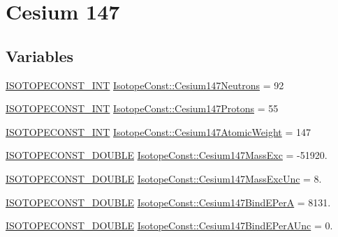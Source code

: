 \hypertarget{group___isotope_const-_cesium-_cs147}{}\section{Cesium 147}
\label{group___isotope_const-_cesium-_cs147}
\subsection*{Variables}
\begin{DoxyCompactItemize}
\item 
\mbox{\hyperlink{group___isotope_const-_macros_ga5f18360b3e99483a35c32d789e62621c}{I\+S\+O\+T\+O\+P\+E\+C\+O\+N\+S\+T\+\_\+\+I\+NT}} \mbox{\hyperlink{group___isotope_const-_cesium-_cs147_gabbcb56b566934b3c788625c9cc69043b}{Isotope\+Const\+::\+Cesium147\+Neutrons}} = 92
\item 
\mbox{\hyperlink{group___isotope_const-_macros_ga5f18360b3e99483a35c32d789e62621c}{I\+S\+O\+T\+O\+P\+E\+C\+O\+N\+S\+T\+\_\+\+I\+NT}} \mbox{\hyperlink{group___isotope_const-_cesium-_cs147_ga363b7089be966faa0757ee5744bb342f}{Isotope\+Const\+::\+Cesium147\+Protons}} = 55
\item 
\mbox{\hyperlink{group___isotope_const-_macros_ga5f18360b3e99483a35c32d789e62621c}{I\+S\+O\+T\+O\+P\+E\+C\+O\+N\+S\+T\+\_\+\+I\+NT}} \mbox{\hyperlink{group___isotope_const-_cesium-_cs147_ga1dedcf764a3126d837083024b1182d49}{Isotope\+Const\+::\+Cesium147\+Atomic\+Weight}} = 147
\item 
\mbox{\hyperlink{group___isotope_const-_macros_ga8f45a7272ce02c0b4c65c44636ed719a}{I\+S\+O\+T\+O\+P\+E\+C\+O\+N\+S\+T\+\_\+\+D\+O\+U\+B\+LE}} \mbox{\hyperlink{group___isotope_const-_cesium-_cs147_ga31bdcfc11c750ce90202ba82a3f59615}{Isotope\+Const\+::\+Cesium147\+Mass\+Exc}} = -\/51920.
\item 
\mbox{\hyperlink{group___isotope_const-_macros_ga8f45a7272ce02c0b4c65c44636ed719a}{I\+S\+O\+T\+O\+P\+E\+C\+O\+N\+S\+T\+\_\+\+D\+O\+U\+B\+LE}} \mbox{\hyperlink{group___isotope_const-_cesium-_cs147_ga306b315117e6e05ff72ec6803461bda5}{Isotope\+Const\+::\+Cesium147\+Mass\+Exc\+Unc}} = 8.
\item 
\mbox{\hyperlink{group___isotope_const-_macros_ga8f45a7272ce02c0b4c65c44636ed719a}{I\+S\+O\+T\+O\+P\+E\+C\+O\+N\+S\+T\+\_\+\+D\+O\+U\+B\+LE}} \mbox{\hyperlink{group___isotope_const-_cesium-_cs147_gabcdcc3380e66b4836eb163f2aec64bbf}{Isotope\+Const\+::\+Cesium147\+Bind\+E\+PerA}} = 8131.
\item 
\mbox{\hyperlink{group___isotope_const-_macros_ga8f45a7272ce02c0b4c65c44636ed719a}{I\+S\+O\+T\+O\+P\+E\+C\+O\+N\+S\+T\+\_\+\+D\+O\+U\+B\+LE}} \mbox{\hyperlink{group___isotope_const-_cesium-_cs147_gae60123b21541de1c4395398fce1b1a44}{Isotope\+Const\+::\+Cesium147\+Bind\+E\+Per\+A\+Unc}} = 0.

\end{DoxyCompactItemize}
